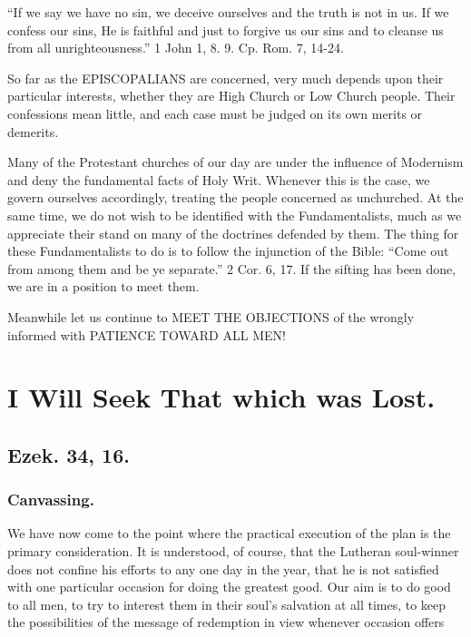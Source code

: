 \documentclass[
]{book}
\begin{document}
``If we say we have no sin, we deceive ourselves and the truth is not in us. If we confess our sins, He is faithful and just to forgive us our sins and to cleanse us from all unrighteousness.'' 1 John 1, 8. 9. Cp. Rom. 7, 14-24.

So far as the EPISCOPALIANS are concerned, very much depends upon their particular interests, whether they are High Church or Low Church people. Their confessions mean little, and each case must be judged on its own merits or demerits.

Many of the Protestant churches of our day are under the influence of Modernism and deny the fundamental facts of Holy Writ. Whenever this is the case, we govern ourselves accordingly, treating the people concerned as unchurched. At the same time, we do not wish to be identified with the Fundamentalists, much as we appreciate their stand on many of the doctrines defended by them. The thing for these Fundamentalists to do is to follow the injunction of the Bible: ``Come out from among them and be ye separate.'' 2 Cor. 6, 17. If the sifting has been done, we are in a position to meet them.

Meanwhile let us continue to MEET THE OBJECTIONS of the wrongly informed with PATIENCE TOWARD ALL MEN!

\chapter{I Will Seek That which was Lost.}\label{i-will-seek-that-which-was-lost.}

\section*{Ezek. 34, 16.}\label{ezek.-34-16.}

\subsection*{Canvassing.}\label{canvassing.}

We have now come to the point where the practical execution of the plan is the primary consideration. It is understood, of course, that the Lutheran soul-winner does not confine his efforts to any one day in the year, that he is not satisfied with one particular occasion for doing the greatest good. Our aim is to do good to all men, to try to interest them in their soul's salvation at all times, to keep the possibilities of the message of redemption in view whenever occasion offers
\end{document}
